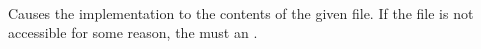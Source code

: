  \\

Causes the implementation to  the contents of the given file. If the file is not accessible for some reason, the  must  an . \\

